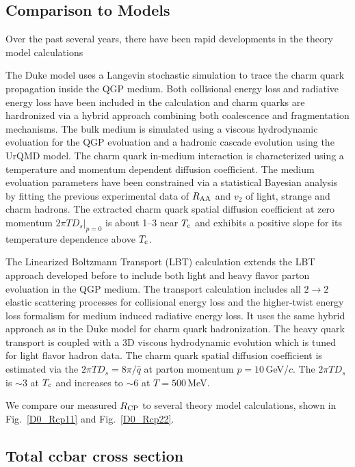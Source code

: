 \subsection{\label{result:theory}Comparison to Models}

Over the past several years, there have been rapid developments in the theory model calculations 

The Duke model uses a Langevin stochastic simulation to trace the charm quark propagation inside the QGP medium. Both collisional energy loss and radiative energy loss have been included in the calculation and charm quarks are hardronized via a hybrid approach combining both coalescence and fragmentation mechanisms. The bulk medium is simulated using a viscous hydrodynamic evoluation for the QGP evoluation and a hadronic cascade evolution using the UrQMD model. The charm quark in-medium interaction is characterized using a temperature and momentum dependent diffusion coefficient. The medium evoluation parameters have been constrained via a statistical Bayesian analysis by fitting the previous experimental data of $R_{\rm AA}$ and $v_{2}$ of light, strange and charm hadrons. The extracted charm quark spatial diffusion coefficient at zero momentum $2\pi TD_s|_{p=0}$ is about 1--3 near $T_{\rm c}$ and exhibits a positive slope for its temperature dependence above $T_{\rm c}$.

The Linearized Boltzmann Transport (LBT) calculation extends the LBT approach developed before to include both light and heavy flavor parton evoluation in the QGP medium. The transport calculation includes all $2\rightarrow 2$ elastic scattering processes for collisional energy loss and the higher-twist energy loss formalism for medium induced radiative energy loss. It uses the same hybrid approach as in the Duke model for charm quark hadronization. The heavy quark transport is coupled with a 3D viscous hydrodynamic evolution which is tuned for light flavor hadron data. The charm quark spatial diffusion coefficient is estimated via the $2\pi TD_s =8\pi/\hat{q}$ at parton momentum $p = 10$\,GeV/$c$. The $2\pi TD_s$ is $\sim$3 at $T_{\rm c}$ and increases to $\sim$6 at $T = 500$\,MeV.

We compare our measured $R_{\rm CP}$ to several theory model calculations, shown in Fig.~\ref{D0_Rcp11} and Fig.~\ref{D0_Rcp22}. 

\subsection{\label{result:totalCC} Total ccbar cross section}


